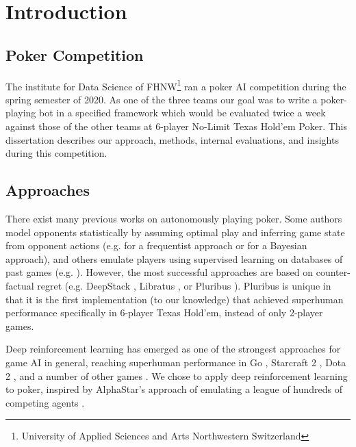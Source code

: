 \chapter{Introduction}
\section{Poker Competition}
The institute for Data Science of FHNW\footnote{University of Applied Sciences and Arts Northwestern Switzerland} ran a poker AI competition during the spring semester of 2020.  As one of the three teams our goal was to write a poker-playing bot in a specified framework which would be evaluated twice a week against those of the other teams at 6-player No-Limit Texas Hold'em Poker. This dissertation describes our approach, methods, internal evaluations, and insights during this competition.

\section{Approaches}
There exist many previous works on autonomously playing poker. Some authors model opponents statistically by assuming optimal play and inferring game state from opponent actions (e.g. \cite{PokerStatMethods1} for a frequentist approach or \cite{PokerStatMethods2} for a Bayesian approach), and others emulate players using supervised learning on databases of past games (e.g. \cite{PokerPlayerEmulation}). However, the most successful approaches are based on counter-factual regret (e.g. DeepStack \cite{Deepstack}, Libratus \cite{Libratus}, or Pluribus \cite{Pluribus}). Pluribus is unique in that it is the first implementation (to our knowledge) that achieved superhuman performance specifically in 6-player Texas Hold'em, instead of only 2-player games.

Deep reinforcement learning has emerged as one of the strongest approaches for game AI in general, reaching superhuman performance in Go \cite{Alphago}, Starcraft 2 \cite{AlphaStar}, Dota 2 \cite{OpenAIFive}, and a number of other games \cite{GamesRL}. We chose to apply deep reinforcement learning to poker, inspired by AlphaStar's approach of emulating a league of hundreds of competing agents \cite{AlphaStar}.